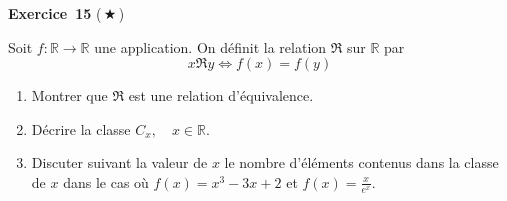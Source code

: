 \documentclass[11pt,a4paper]{article}
\begin{document}
	\medskip\noindent\textbf{\Large\color{bleu}Exercice~15} \textnormal{(\,$\bigstar$\,)}\nopagebreak
	\begin{enonce}
		Soit $f : \mathbb{R} \longrightarrow \mathbb{R}$ une application. On définit la relation $\mathfrak{R}$ sur $\mathbb{R}$ par
		\[
		x \mathfrak{R} y \Leftrightarrow f(x) = f(y)
		\]
		\begin{enumerate}
			\item Montrer que $\mathfrak{R}$ est une relation d'équivalence.
			\item Décrire la classe $C_x, \quad x \in \mathbb{R}$.
			\item Discuter suivant la valeur de $x$ le nombre d'éléments contenus dans la classe de $x$ dans le cas où $f(x) = x^3 - 3x + 2$ et $f(x) = \frac{x}{e^x}$.
		\end{enumerate}
	\end{enonce}
\end{document}
